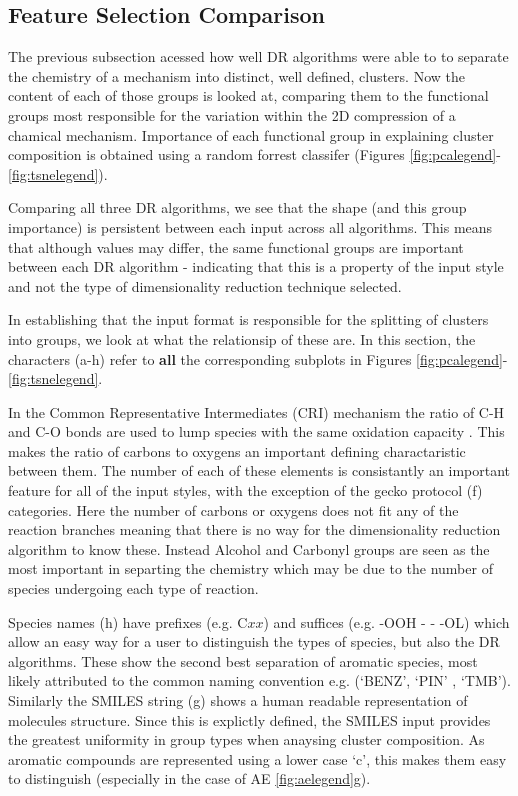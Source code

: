 \subsection{Feature Selection Comparison}\label{sec:fsclust}

The previous subsection acessed how well DR algorithms were able to to  separate the chemistry of a mechanism into distinct, well defined, clusters. Now the content of each of those groups is looked at, comparing them to the  functional groups most responsible for the variation within the 2D compression of a chamical mechanism. Importance of each functional group in explaining cluster composition is obtained using a random forrest classifer (Figures \ref{fig:pcalegend}-\ref{fig:tsnelegend}).

Comparing all three DR algorithms, we see that the shape (and this group importance) is persistent between each input across all algorithms. This means that although values may differ, the same functional groups are important between each DR algorithm - indicating that this is a property of the input style and not the type of dimensionality reduction technique selected.

In establishing that the input format is responsible for the splitting of clusters into groups, we look at what the relationsip of these are. In this section, the characters (a-h) refer to \textbf{all} the corresponding subplots in Figures \ref{fig:pcalegend}-\ref{fig:tsnelegend}.

 In the Common Representative Intermediates (CRI) mechanism the ratio of C-H and C-O bonds are used to lump species with the same oxidation capacity \citep{cri}. This makes the ratio of carbons to oxygens an important defining charactaristic between them. The number of each of these elements is consistantly an important feature for all of the input styles, with the exception of the gecko protocol (f) categories. Here the number of carbons or oxygens does not fit any of the reaction branches meaning that there is no way for the dimensionality reduction algorithm to know these. Instead Alcohol and Carbonyl groups are seen as the most important in separting the chemistry which may be due to the number of species undergoing each type of reaction.

 Species names (h) have prefixes (e.g. C$xx$) and suffices (e.g. -OOH - - -OL) which allow an easy way for a user to distinguish the types of species, but also the DR algorithms. These show the second best separation of aromatic species, most likely attributed to the common naming convention e.g. (`BENZ', `PIN' , `TMB'). Similarly the SMILES string (g) shows a human readable representation of molecules structure. Since this is explictly defined, the SMILES input provides the greatest uniformity in group types when anaysing cluster composition. As aromatic compounds are represented using a lower case `c', this makes them easy to distinguish (especially in the case of AE \autoref{fig:aelegend}g).

